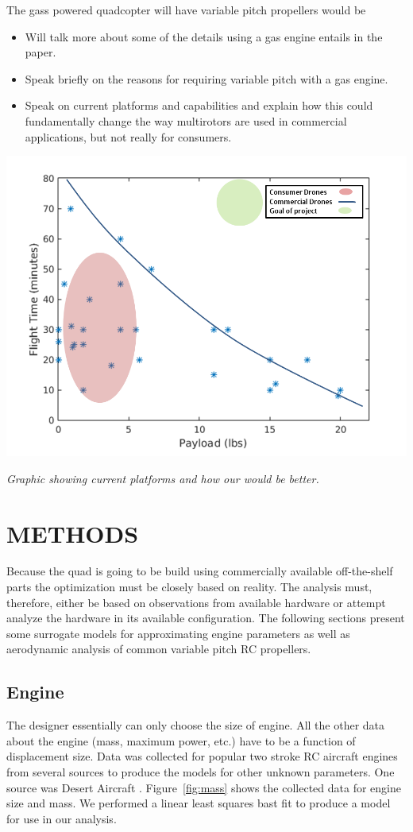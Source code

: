 \documentclass[letterpaper, 10 pt, conference]{ieeeconf}  %
\makeatletter
\newenvironment{figurehere}
  {\def\@captype{figure}}
  {}
\makeatother
\begin{document}
The gass powered quadcopter will have variable pitch propellers would be  
\begin{itemize}
	\item{Will talk more about some of the details using a gas engine entails in the paper.}
	\item{Speak briefly on the reasons for requiring variable pitch with a gas engine.} 
	\item{Speak on current platforms and capabilities and explain how this could fundamentally change the way multirotors are used in commercial applications, but not really for consumers.}
\end{itemize}


\begin{figurehere}
	\begin{center}
		\includegraphics[width=.40\textwidth]{current_capabilities.png}
		\caption{\textit{Graphic showing current platforms and how our would be better.}}
		\label{current_cap}
	\end{center}
\end{figurehere}

	
\section{METHODS}

Because the quad is going to be build using commercially available off-the-shelf parts the optimization must be closely based on reality.  The analysis must, therefore, either be based on observations from available hardware or attempt analyze the hardware in its available configuration.  The following sections present some surrogate models for approximating engine parameters as well as aerodynamic analysis of common variable pitch RC propellers. 

\subsection{Engine} 

The designer essentially can only choose the size of engine. All the other data about the engine (mass, maximum power, etc.) have to be a function of displacement size.  Data was collected for popular two stroke RC aircraft engines from several sources to produce the models for other unknown parameters. One source was Desert Aircraft \cite{da2016}.  Figure~\ref{fig:mass} shows the collected data for engine size and mass.  We performed a linear least squares bast fit to produce a model for use in our analysis.
\end{document}
